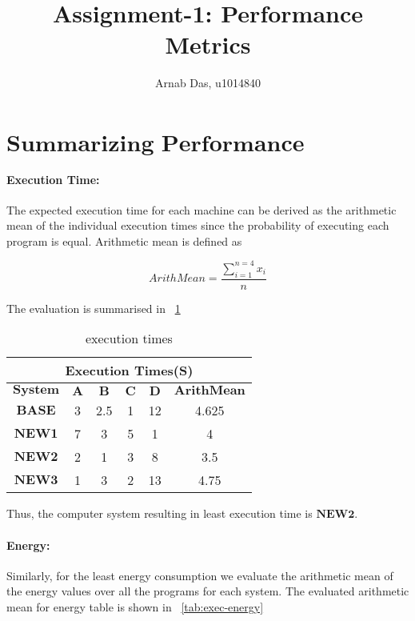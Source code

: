 \documentclass{tufte-handout}
\title{Assignment-1: Performance Metrics}
\author[]{Arnab Das, u1014840}
\begin{document}
  
  \maketitle%
  

 \setcounter{secnumdepth}{1}

\newpage
\section{$\textbf{Summarizing Performance Numbers}$}
	\paragraph{Execution Time:} The expected execution time for each machine can be derived as the arithmetic mean of the individual execution times since the probability of executing each program is equal. Arithmetic mean is defined as 
	
	  \[
	  	ArithMean = \dfrac{\sum_{i=1}^{n=4} x_i}{n}
	  \]

	The evaluation is summarised in ~\ref{tab:exec-time}

	\begin{table}[!htb]
	    \centering
	    \selectfont
		\renewcommand{\arraystretch}{3.0}
		\label{tab:exec-time}
	    \begin{tabular}{c|c|c|c|c|c}
	      \toprule
		  \multicolumn{6}{|c|}{Execution Times(S)}  \\
	      \midrule 
		  $\textbf{System}$ & $\textbf{A}$ & $\textbf{B}$ & $\textbf{C}$ & $\textbf{D}$ & $\textbf{ArithMean}$ \\  %
		  $\textbf{BASE}$ & 3 & 2.5 & 1 & 12 & 4.625 \\
		  $\textbf{NEW1}$ & 7 & 3 & 5 & 1 & 4 \\
		  $\textbf{NEW2}$ & 2 & 1 & 3 & 8 & 3.5 \\
		  $\textbf{NEW3}$ & 1 & 3 & 2 & 13 & 4.75 \\
	      \bottomrule
	    \end{tabular}
	    \caption{ execution times }
	  \end{table}

	  Thus, the computer system resulting in least execution time is $\textbf{NEW2}$.
	

	  \paragraph{Energy: } Similarly, for the least energy consumption we evaluate the arithmetic mean of the energy values over all the programs for each system. The evaluated  arithmetic mean for energy table is shown in ~\ref{tab:exec-energy} 
	  
\end{document}
